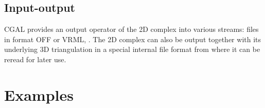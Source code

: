 \subsection{Input-output}
CGAL provides an  output operator of the
2D complex into  various streams:
files in format  OFF or VRML, .
The 2D complex can also be output together with its underlying 3D triangulation
in a special internal file format from where it can be reread for later use.



\section{Examples\label{section_C2inT3_Examples}}






